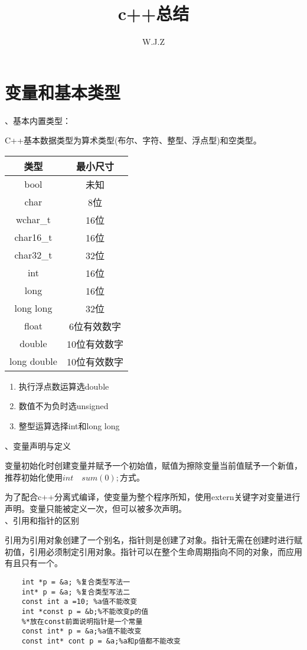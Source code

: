 \documentclass{article}
\title{c++总结}
\author{W.J.Z}
\date{}
\begin{document}
\maketitle
\section{变量和基本类型}
	、基本内置类型：
	
	C++基本数据类型为算术类型(布尔、字符、整型、浮点型)和空类型。\\
	
	\begin{tabular}{|c|c|}
		\hline
		类型 & 最小尺寸 \\
		\hline
		bool & 未知 \\
		char & 8位 \\
		wchar\_t & 16位 \\
		char16\_t & 16位\\
		char32\_t & 32位 \\
		int & 16位 \\
		long & 16位 \\
		long long & 32位\\
		float & 6位有效数字\\
		double & 10位有效数字 \\
		long double & 10位有效数字\\
		\hline
	\end{tabular}	

	\begin{enumerate}[技巧1:]
		\item 执行浮点数运算选double
		\item 数值不为负时选unsigned
		\item 整型运算选择int和long long
	\end{enumerate}
		
	、变量声明与定义
	
	变量初始化时创建变量并赋予一个初始值，赋值为擦除变量当前值赋予一个新值，推荐初始化使用$int \quad sum(0);$方式。
	
	为了配合c++分离式编译，使变量为整个程序所知，使用extern关键字对变量进行声明。变量只能被定义一次，但可以被多次声明。
	\\
	
	、引用和指针的区别
	
	引用为引用对象创建了一个别名，指针则是创建了对象。指针无需在创建时进行赋初值，引用必须制定引用对象。指针可以在整个生命周期指向不同的对象，而应用有且只有一个。
	\begin{lstlisting}
	int *p = &a; %复合类型写法一
	int* p = &a; %复合类型写法二
	const int a =10; %a值不能改变
	int *const p = &b;%不能改变p的值
	%*放在const前面说明指针是一个常量
	const int* p = &a;%a值不能改变
	const int* cont p = &a;%a和p值都不能改变
	\end{lstlisting}
	
\end{document}
